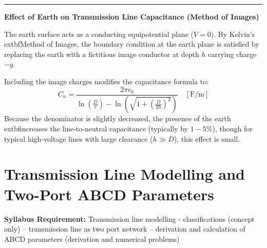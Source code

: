 \documentclass[11pt,a4paper]{article}
\newcommand{\concept}[1]{%
  \vspace{3pt}\noindent\textcolor{AnthGreen}{\rule{3.5pt}{10pt}}\enspace
  \textbf{\sffamily\color{AnthDark}#1}\par\vspace{2pt}%
}
\newcommand{\syllabusitem}[1]{%
  \begin{tcolorbox}[enhanced, colback=AnthOrange!8, colframe=AnthOrange, boxrule=0.4pt, arc=3pt, left=7pt, right=7pt, top=3pt, bottom=3pt]
    \small\sffamily\textbf{\color{AnthOrange}Syllabus Requirement:} #1
  \end{tcolorbox}
}
\begin{document}
\concept{Effect of Earth on Transmission Line Capacitance (Method of Images)}
The earth surface acts as a conducting equipotential plane ($V=0$). By Kelvin's 	extbf{Method of Images}, the boundary condition at the earth plane is satisfied by replacing the earth with a fictitious image conductor at depth $h$ carrying charge $-q$.

\begin{center}
\end{center}

Including the image charges modifies the capacitance formula to:
\begin{equation}
  C_n = \frac{2\pi \epsilon_0}{\ln\left(\frac{D}{r}\right) - \ln\left(\sqrt{1 + \left(\frac{D}{2h}\right)^2}\right)} \quad [\text{F/m}]
\end{equation}
Because the denominator is slightly decreased, the presence of the earth 	extbf{increases the line-to-neutral capacitance} (typically by $1-5\%$), though for typical high-voltage lines with large clearance ($h \gg D$), this effect is small.

\clearpage
\section{Transmission Line Modelling and Two-Port ABCD Parameters}

\syllabusitem{Transmission line modelling - classifications (concept only) – transmission line as two port network – derivation and calculation of ABCD parameters (derivation and numerical problems)}
\end{document}
